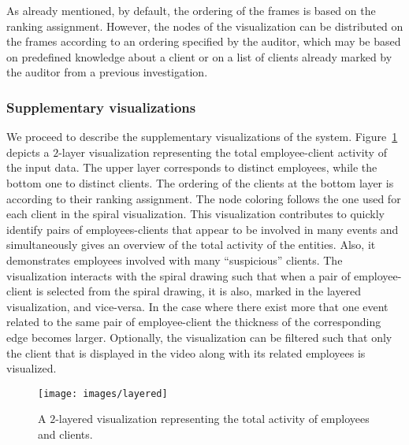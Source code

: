 \documentclass[conference]{IEEEtran}
\begin{document}
As already mentioned, by default, the ordering of the frames is
based on the ranking assignment. However, the nodes of the
visualization can be distributed on the frames according to an
ordering specified by the auditor, which may be based on predefined
knowledge about a client or on a list of clients already marked by
the auditor from a previous investigation.

\subsubsection{Supplementary visualizations}

We proceed to describe the supplementary visualizations of the
system. Figure~\ref{fig:layered} depicts a $2$-layer visualization
representing the total employee-client activity of the input data.
The upper layer corresponds to distinct employees, while the bottom
one to distinct clients. The ordering of the clients at the bottom
layer is according to their ranking assignment. The node coloring
follows the one used for each client in the spiral visualization.
This visualization contributes to quickly identify pairs of
employees-clients that appear to be involved in many events and
simultaneously gives an overview of the total activity of the
entities. Also, it demonstrates employees involved with many
``suspicious'' clients. The visualization interacts with the spiral
drawing such that when a pair of employee-client is selected from
the spiral drawing, it is also, marked in the layered visualization,
and vice-versa. In the case where there exist more that one event
related to the same pair of employee-client the thickness of the
corresponding edge becomes larger. Optionally, the visualization can
be filtered such that only the client that is displayed in the video
along with its related employees is visualized.

\begin{figure}[h!tb]
  \texttt{[image: images/layered]}
  \caption{A $2$-layered visualization representing the total activity of employees and clients.}
  \label{fig:layered}
\end{figure}
\end{document}
